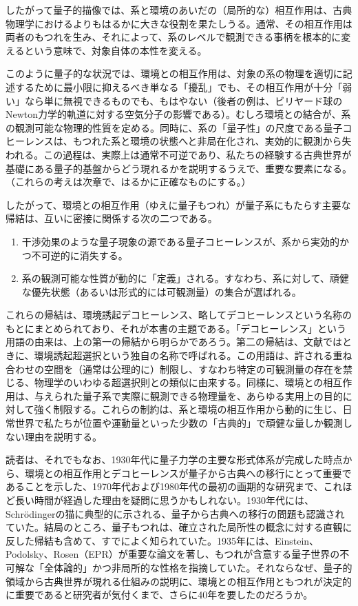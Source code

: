 したがって量子的描像では、系と環境のあいだの（局所的な）相互作用は、古典物理学におけるよりもはるかに大きな役割を果たしうる。通常、その相互作用は両者のもつれを生み、それによって、系のレベルで観測できる事柄を根本的に変えるという意味で、対象自体の本性を変える。

このように量子的な状況では、環境との相互作用は、対象の系の物理を適切に記述するために最小限に抑えるべき単なる「擾乱」でも、その相互作用が十分「弱い」なら単に無視できるものでも、もはやない（後者の例は、ビリヤード球のNewton力学的軌道に対する空気分子の影響である）。むしろ環境との結合が、系の観測可能な物理的性質を定める。同時に、系の「量子性」の尺度である量子コヒーレンスは、もつれた系と環境の状態へと非局在化され、実効的に観測から失われる。この過程は、実際上は通常不可逆であり、私たちの経験する古典世界が基礎にある量子的基盤からどう現れるかを説明するうえで、重要な要素になる。（これらの考えは次章で、はるかに正確なものにする。）

\hypertarget{srcpage:6}{}\label{srcpage:6}したがって、環境との相互作用（ゆえに量子もつれ）が量子系にもたらす主要な帰結は、互いに密接に関係する次の二つである。
\begin{enumerate}
\item 干渉効果のような量子現象の源である量子コヒーレンスが、系から実効的かつ不可逆的に消失する。
\item 系の観測可能な性質が動的に「定義」される。すなわち、系に対して、頑健な優先状態（あるいは形式的には可観測量）の集合が選ばれる。
\end{enumerate}

これらの帰結は、環境誘起デコヒーレンス、略してデコヒーレンスという名称のもとにまとめられており、それが本書の主題である。「デコヒーレンス」という用語の由来は、上の第一の帰結から明らかであろう。第二の帰結は、文献ではときに、環境誘起超選択という独自の名称で呼ばれる。この用語は、許される重ね合わせの空間を（通常は公理的に）制限し、すなわち特定の可観測量の存在を禁じる、物理学のいわゆる超選択則との類似に由来する。同様に、環境との相互作用は、与えられた量子系で実際に観測できる物理量を、あらゆる実用上の目的に対して強く制限する。これらの制約は、系と環境の相互作用から動的に生じ、日常世界で私たちが位置や運動量といった少数の「古典的」で頑健な量しか観測しない理由を説明する。

読者は、それでもなお、1930年代に量子力学の主要な形式体系が完成した時点から、環境との相互作用とデコヒーレンスが量子から古典への移行にとって重要であることを示した、1970年代および1980年代の最初の画期的な研究\cite{ref004,ref005,ref006,ref007,ref008,ref009}まで、これほど長い時間が経過した理由を疑問に思うかもしれない。1930年代には、Schrödingerの猫に典型的に示される、量子から古典への移行の問題も認識されていた。結局のところ、量子もつれは、確立された局所性の概念に対する直観に反した帰結も含めて、すでによく知られていた。1935年には、Einstein、Podolsky、Rosen（EPR）\cite{ref010}が重要な論文を著し、もつれが含意する量子世界の不可解な「全体論的」かつ非局所的な性格を指摘していた。それならなぜ、量子的領域から古典世界が現れる仕組みの説明に、環境との相互作用ともつれが決定的に重要であると研究者が気付くまで、さらに40年を要したのだろうか。

